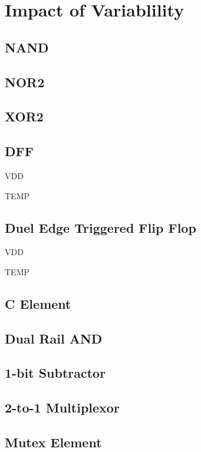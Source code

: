 \chapter{Impact of Variablility}


\section{NAND}

\section{NOR2}

\section{XOR2}

\section{DFF}

VDD

TEMP


\section{Duel Edge Triggered Flip Flop}

VDD

TEMP

\section{C Element}

\section{Dual Rail AND}

\section{1-bit Subtractor}

\section{2-to-1 Multiplexor}

\section{Mutex Element}

